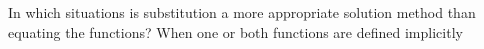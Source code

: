 {In which situations is substitution a more appropriate solution method than equating the functions?}
{When one or both functions are defined implicitly}
